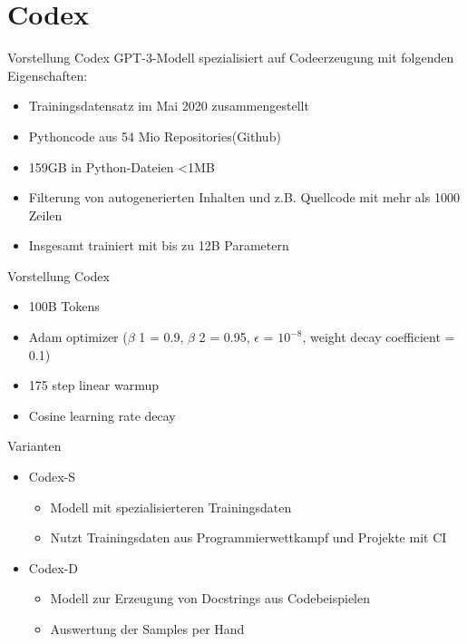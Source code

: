 \documentclass{beamer}              %
\begin{document}
\section{Codex}
\begin{frame}{Vorstellung Codex}
GPT-3-Modell spezialisiert auf Codeerzeugung mit folgenden Eigenschaften:\cite{chen2021evaluating}
\begin{itemize}
    \item Trainingsdatensatz im Mai 2020 zusammengestellt
    \item Pythoncode aus 54 Mio Repositories(Github)
    \item 159GB in Python-Dateien <1MB
    \item Filterung von autogenerierten Inhalten und z.B. Quellcode mit mehr als 1000 Zeilen
    \item Insgesamt trainiert mit bis zu 12B Parametern
\end{itemize}
\end{frame}

\begin{frame}[fragile]{Vorstellung Codex}
\begin{itemize}
    \item 100B Tokens
    \item Adam optimizer (\(\beta\) 1 = 0.9, \(\beta\) 2 = 0.95, \(\epsilon\) = $10^{-8}$, weight decay coefficient = 0.1)
    \item 175 step linear warmup
    \item Cosine learning rate decay

\end{itemize}
\end{frame}

\begin{frame}{Varianten}
\begin{itemize}
    \item Codex-S\cite{chen2021evaluating}
    \begin{itemize}
        \item Modell mit spezialisierteren Trainingsdaten
        \item Nutzt Trainingsdaten aus Programmierwettkampf und Projekte mit CI
    \end{itemize}
    \item Codex-D\cite{chen2021evaluating}
    \begin{itemize}
        \item Modell zur Erzeugung von Docstrings aus Codebeispielen
        \item Auswertung der Samples per Hand
    \end{itemize}
\end{itemize}
\end{frame}
\end{document}
